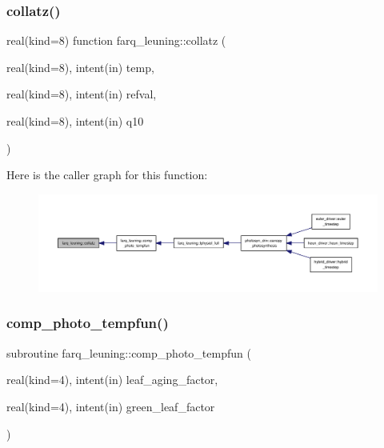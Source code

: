 \subsubsection{\texorpdfstring{collatz()}{collatz()}}
{\footnotesize\ttfamily real(kind=8) function farq\+\_\+leuning\+::collatz (\begin{DoxyParamCaption}\item[{real(kind=8), intent(in)}]{temp,  }\item[{real(kind=8), intent(in)}]{refval,  }\item[{real(kind=8), intent(in)}]{q10 }\end{DoxyParamCaption})}

Here is the caller graph for this function\+:
\nopagebreak
\begin{figure}[H]
\begin{center}
\leavevmode
\includegraphics[width=350pt]{namespacefarq__leuning_ab284bec4bd11bda7c190c6ae2de979fb_icgraph}
\end{center}
\end{figure}
\mbox{\label{namespacefarq__leuning_a9b3b89dd90573241f7a95685e0c416f6}} 
\subsubsection{\texorpdfstring{comp\+\_\+photo\+\_\+tempfun()}{comp\_photo\_tempfun()}}
{\footnotesize\ttfamily subroutine farq\+\_\+leuning\+::comp\+\_\+photo\+\_\+tempfun (\begin{DoxyParamCaption}\item[{real(kind=4), intent(in)}]{leaf\+\_\+aging\+\_\+factor,  }\item[{real(kind=4), intent(in)}]{green\+\_\+leaf\+\_\+factor }\end{DoxyParamCaption})}

